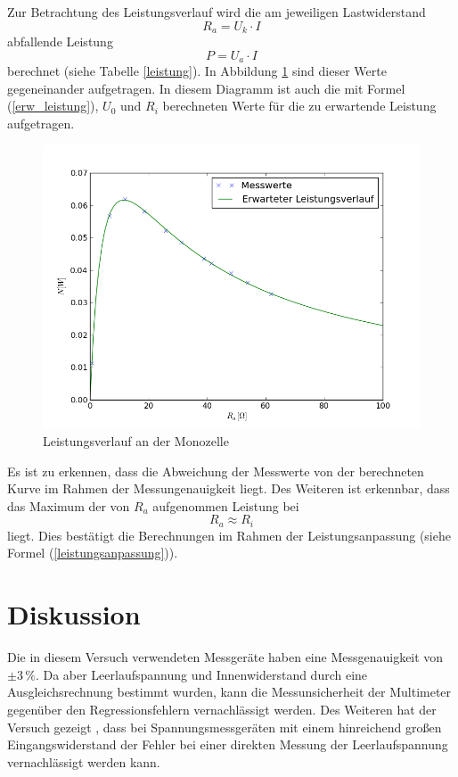 \documentclass[11pt,ngerman,a4paper]{article}
\begin{document}
Zur Betrachtung des Leistungsverlauf wird die am jeweiligen Lastwiderstand 
\begin{equation}
R_a = U_k \cdot I
\end{equation}
 abfallende Leistung
\begin{equation}
P = U_a\cdot  I
\end{equation}
berechnet (siehe Tabelle \ref{leistung}). In Abbildung \ref{Plot4} sind dieser Werte gegeneinander aufgetragen. In diesem Diagramm ist auch die mit Formel (\ref{erw_leistung}), $U_0$ und $R_i$ berechneten Werte f\"ur die zu erwartende Leistung aufgetragen.
\begin{figure}
\centering
\includegraphics[scale=1.00]{Plot4.png}
\caption{Leistungsverlauf an der Monozelle}
\label{Plot4}
\end{figure}
Es ist zu erkennen, dass die Abweichung der Messwerte von der berechneten Kurve im Rahmen der Messungenauigkeit liegt. Des Weiteren ist erkennbar, dass das Maximum der von $R_a$ aufgenommen Leistung bei 
\[
R_a \approx R_i
\]
liegt. Dies best\"atigt die Berechnungen im Rahmen der Leistungsanpassung (siehe Formel (\ref{leistungsanpassung})).
\newpage
\section{Diskussion}
Die in diesem Versuch verwendeten Messgeräte haben eine Messgenauigkeit von $\pm 3\,\%$. Da aber Leerlaufspannung und Innenwiderstand durch eine Ausgleichsrechnung bestimmt wurden, kann die Messunsicherheit der Multimeter gegenüber den Regressionsfehlern vernachlässigt werden. 
Des Weiteren hat der Versuch gezeigt , dass bei Spannungsmessgeräten mit einem hinreichend großen Eingangswiderstand der Fehler bei einer direkten Messung der Leerlaufspannung vernachlässigt werden kann.
\end{document}
